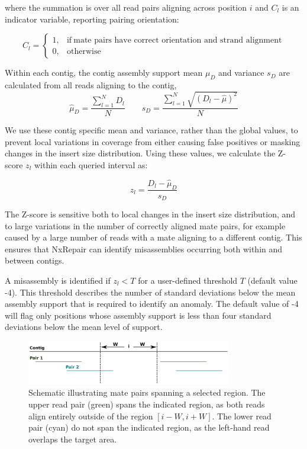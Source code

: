 where the summation is over all read pairs aligning across position $i$ and $C_l$ is an indicator variable, reporting pairing orientation:

\begin{equation}
    C_l=
    \begin{cases}
      1, & \text{if}\ \text{mate pairs have correct orientation and strand alignment} \\
      0, & \text{otherwise}
    \end{cases}
  \label{eq:C}
  \end{equation}

Within each contig, the contig assembly support mean $\mu_D$ and variance $s_D$ are calculated from all reads aligning to the contig,
\begin{equation}
\hat{\mu}_D = \frac{\sum_{l=1}^N D_l}{N} \qquad s_D = \frac{\sum_{l=1}^N \sqrt{(D_l - \hat{\mu})^2}}{N}
\label{eq:contigD}
\end{equation}

We use these contig specific mean and variance, rather than the global values, to prevent local variations in coverage from either causing false positives or masking changes in the insert size distribution. Using these values, we calculate the Z-score $z_l$ within each queried interval as: 

\begin{equation}
z_l = \frac{D_l - \hat{\mu}_D}{s_D}
\label{eq:zscore}
\end{equation}

The Z-score is sensitive both to local changes in the insert size distribution, and to large variations in the number of correctly aligned mate pairs, for example caused by a large number of reads with a mate aligning to a different contig. This ensures that NxRepair can identify misassemblies occurring both within and between contigs.  

A misassembly is identified if $z_l < T$ for a user-defined threshold $T$ (default value -4). This threshold describes the number of standard deviations below the mean assembly support that is required to identify an anomaly. The default value of -4 will flag only positions whose assembly support is less than four standard deviations below the mean level of support.

\begin{figure}
\centerline{\includegraphics[width=0.8\textwidth]{illumina/spanning.pdf}}
\caption{Schematic illustrating mate pairs spanning a selected region. The upper read pair (green) spans the indicated region, as both reads align entirely outside of the region $[i-W, i+W]$. The lower read pair (cyan) do not span the indicated region, as the left-hand read overlaps the target area. \label{fig:spanning}}
\end{figure}

